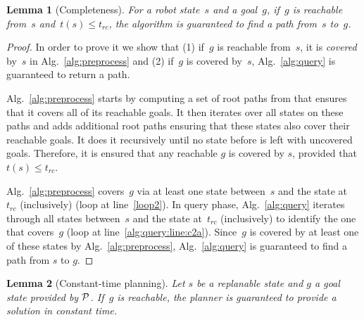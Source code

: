 \documentclass[conference]{IEEEtran}
\newtheorem{lemma}{Lemma}
\begin{document}

\begin{lemma}[Completeness]
For a robot state~$s$ and a goal~$g$, if~$g$ is \emph{reachable} from~$s$ and~$t(s) \leq t_{rc}$, the algorithm is guaranteed to find a path from~$s$ to~$g$.
\end{lemma}

\begin{proof}
In order to prove it we show that (1) if~$g$ is reachable from~$s$, it is \emph{covered} by~$s$ in Alg.~\ref{alg:preprocess} and (2) if~$g$ is covered by~$s$, Alg.~\ref{alg:query} is guaranteed to return a path.

Alg.~\ref{alg:preprocess} starts by computing a set of root paths from \Shome that ensures that it covers all of its reachable goals. It then iterates over all states on these paths and adds additional root paths ensuring that these states also cover their reachable goals. It does it recursively until no state before \Trc is left with uncovered goals. Therefore, it is ensured that any reachable $g$ is covered by $s$, provided that $t(s) \leq t_{rc}$. 
    
Alg.~\ref{alg:preprocess} covers~$g$ via at least one state between~$s$ and the state at~$t_{rc}$ (inclusively) (loop at line~\ref{loop2}).
In query phase, Alg.~\ref{alg:query} iterates through all states between~$s$ and the state at~$t_{rc}$ (inclusively) to identify the one that covers~$g$ (loop at line~\ref{alg:query:line:c2a}). Since~$g$ is covered by at least one of these states by Alg.~\ref{alg:preprocess}, Alg.~\ref{alg:query} is guaranteed to find a path from $s$ to $g$.

\end{proof}

\begin{lemma}[Constant-time planning]
\label{lemma:bounded_time}
Let $s$ be a replanable state and $g$ a goal state provided by $\mathcal{P}$.
If~$g$ is reachable, the planner is guaranteed to provide a solution in constant time.
\end{lemma}
\end{document}
